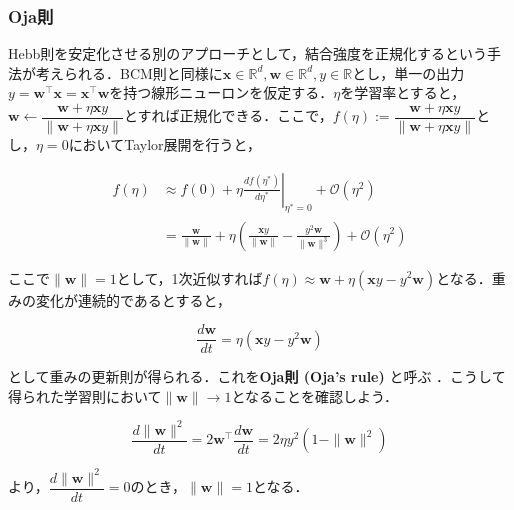 \subsubsection{Oja則}
Hebb則を安定化させる別のアプローチとして，結合強度を正規化するという手法が考えられる．BCM則と同様に$\mathbf{x}\in \mathbb{R}^d, \mathbf{w}\in \mathbb{R}^d, y\in \mathbb{R}$とし，単一の出力$y = \mathbf{w}^\top \mathbf{x}=\mathbf{x}^\top \mathbf{w}$を持つ線形ニューロンを仮定する．$\eta$を学習率とすると，$\mathbf{w}\leftarrow\dfrac{\mathbf{w}+\eta \mathbf{x}y}{\|\mathbf{w}+\eta \mathbf{x}y\|}$とすれば正規化できる．ここで，$f(\eta):=\dfrac{\mathbf{w}+\eta \mathbf{x}y}{\|\mathbf{w}+\eta \mathbf{x}y\|}$とし，$\eta=0$においてTaylor展開を行うと，


\begin{align}
f(\eta)&\approx f(0) + \eta \left.\frac{df(\eta^*)}{d\eta^*}\right|_{\eta^*=0} + \mathcal{O}(\eta^2)\\
&=\frac{\mathbf{w}}{\|\mathbf{w}\|} + \eta \left(\frac{\mathbf{x}y}{\|\mathbf{w}\|}-\frac{y^2\mathbf{w}}{\|\mathbf{w}\|^3}\right)+ \mathcal{O}(\eta^2)
\end{align}


ここで$\|\mathbf{w}\|=1$として，1次近似すれば$f(\eta)\approx \mathbf{w} + \eta \left(\mathbf{x}y-y^2 \mathbf{w}\right)$となる．重みの変化が連続的であるとすると，


\begin{equation}
\frac{d\mathbf{w}}{dt} = \eta \left(\mathbf{x}y-y^2 \mathbf{w}\right)
\end{equation}


として重みの更新則が得られる．これを\textbf{Oja則 (Oja's rule)} と呼ぶ \cite{Oja1982-yd}．こうして得られた学習則において$\|\mathbf{w}\|\to 1$となることを確認しよう．


\begin{equation}
\frac{d\|\mathbf{w}\|^2}{dt}=2\mathbf{w}^\top\frac{d\mathbf{w}}{dt}= 2\eta y^2\left(1-\|\mathbf{w}\|^2\right)
\end{equation}


より，$\dfrac{d\|\mathbf{w}\|^2}{dt}=0$のとき，$\|\mathbf{w}\|= 1$となる．
